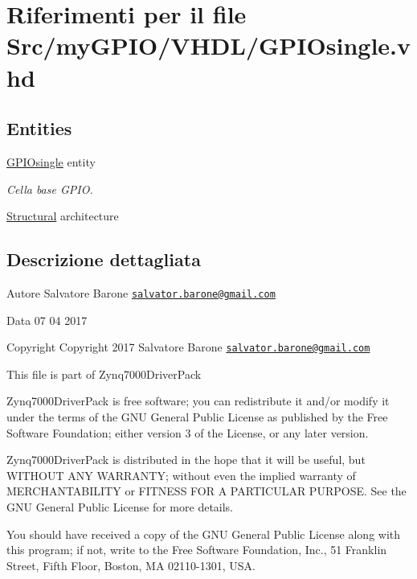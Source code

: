 \hypertarget{_g_p_i_osingle_8vhd}{\section{Riferimenti per il file Src/my\+G\+P\+I\+O/\+V\+H\+D\+L/\+G\+P\+I\+Osingle.vhd}
\label{_g_p_i_osingle_8vhd}
}
\subsection*{Entities}
\begin{DoxyCompactItemize}
\item 
\hyperlink{class_g_p_i_osingle}{G\+P\+I\+Osingle} entity
\begin{DoxyCompactList}\small\item\em Cella base G\+P\+I\+O. \end{DoxyCompactList}\item 
\hyperlink{class_g_p_i_osingle_1_1_structural}{Structural} architecture
\end{DoxyCompactItemize}


\subsection{Descrizione dettagliata}
\begin{DoxyAuthor}{Autore}
Salvatore Barone \href{mailto:salvator.barone@gmail.com}{\tt salvator.\+barone@gmail.\+com} 
\end{DoxyAuthor}
\begin{DoxyDate}{Data}
07 04 2017
\end{DoxyDate}
\begin{DoxyCopyright}{Copyright}
Copyright 2017 Salvatore Barone \href{mailto:salvator.barone@gmail.com}{\tt salvator.\+barone@gmail.\+com}
\end{DoxyCopyright}
This file is part of Zynq7000\+Driver\+Pack

Zynq7000\+Driver\+Pack is free software; you can redistribute it and/or modify it under the terms of the G\+N\+U General Public License as published by the Free Software Foundation; either version 3 of the License, or any later version.

Zynq7000\+Driver\+Pack is distributed in the hope that it will be useful, but W\+I\+T\+H\+O\+U\+T A\+N\+Y W\+A\+R\+R\+A\+N\+T\+Y; without even the implied warranty of M\+E\+R\+C\+H\+A\+N\+T\+A\+B\+I\+L\+I\+T\+Y or F\+I\+T\+N\+E\+S\+S F\+O\+R A P\+A\+R\+T\+I\+C\+U\+L\+A\+R P\+U\+R\+P\+O\+S\+E. See the G\+N\+U General Public License for more details.

You should have received a copy of the G\+N\+U General Public License along with this program; if not, write to the Free Software Foundation, Inc., 51 Franklin Street, Fifth Floor, Boston, M\+A 02110-\/1301, U\+S\+A. 